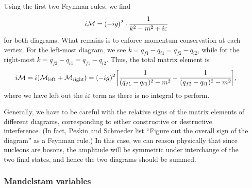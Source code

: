Using the first two Feynman rules, we find
\begin{equation}
	\label{eq:01_qft_interactions_nn_scattering_1}
	i \mathcal M = (-ig)^2 \cdot  \cfrac{1}{k^2 - m^2 + i\varepsilon}
\end{equation}
for both diagrams.
What remains is to enforce momentum conservation at each vertex.
For the left-most diagram, we see $k = q_{f1} - q_{i1} = q_{f2} - q_{i2}$, while for the right-most $k = q_{f2} - q_{i1} = q_{f1} - q_{i2}$.
Thus, the total matrix element is
\begin{equation}
	\label{eq:01_qft_interactions_nn_scattering_2}
	i \mathcal M = i(\mathcal M_{\mathrm{left}} + \mathcal M_{\mathrm{right}}) = (-ig)^2 \bigg[ \cfrac{1}{(q_{f1} - q_{i1})^2 - m^2} + \cfrac{1}{(q_{f2} - q_{i1})^2 - m^2} \bigg],
\end{equation}
where we have left out the $i\varepsilon$ term as there is no integral to perform.

Generally, we have to be careful with the relative signs of the matrix elements of different diagrams, corresponding to either constructive or destructive interference.
(In fact, Peskin and Schroeder list ``Figure out the overall sign of the diagram'' as a Feynman rule.)
In this case, we can reason physically that since nucleons are bosons, the amplitude will be symmetric under interchange of the two final states, and hence the two diagrams should be summed.

\subsubsection{Mandelstam variables}

